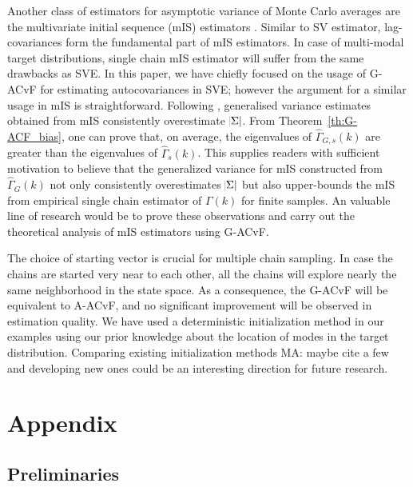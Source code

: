 \documentclass[11pt]{article}
\theoremstyle{remark}
\begin{document}
Another class of estimators for asymptotic variance of Monte Carlo averages are the multivariate initial sequence (mIS) estimators \citep{dai:jon:2017}. Similar to SV estimator, lag-covariances form the fundamental part of mIS estimators. In case of multi-modal target distributions, single chain mIS estimator will suffer from the same drawbacks as SVE. In this paper, we have chiefly focused on the usage of G-ACvF for estimating autocovariances in SVE; however the argument for a similar usage in mIS is straightforward.  Following \cite{dai:jon:2017}, generalised variance estimates obtained from mIS consistently overestimate $\abs{\Sigma}$. From Theorem~\ref{th:G-ACF_bias}, one can prove that, on average, the eigenvalues of $\hat{\Gamma}_{G,s}(k)$ are greater than the eigenvalues of $\hat{\Gamma}_s(k)$. This supplies readers with sufficient motivation to believe that the generalized variance for mIS constructed from $\hat{\Gamma}_G(k)$ not only consistently overestimates $\abs{\Sigma}$ but also upper-bounds the mIS from empirical single chain estimator of $\Gamma(k)$ for finite samples. An valuable line of research would be to prove these observations and carry out the theoretical analysis of mIS estimators using G-ACvF. 
%

The choice of starting vector is crucial for multiple chain sampling. In case the chains are started very near to each other, all the chains will explore nearly the same neighborhood in the state space. As a consequence, the G-ACvF will be equivalent to A-ACvF, and no significant improvement will be observed in estimation quality. We have used a deterministic initialization method in our examples using our prior knowledge about the location of modes in the target distribution. Comparing existing initialization methods {\color{orange} MA: maybe cite a few} and developing new ones could be an interesting direction for future research.  

\section{Appendix}  \label{sec:appendix}
\subsection{Preliminaries} \label{apdx:preliminaries}
\end{document}
